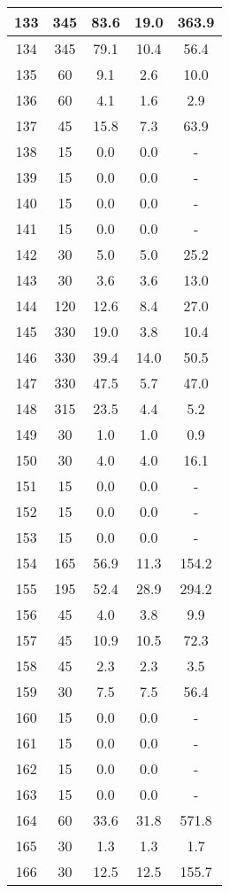 \documentclass[a4paper,10pt]{article}
\begin{document}
\begin{table}
\begin{tabular}{|c|c|c|c|c|}
\hline
133 & 345 & 83.6 & 19.0 & 363.9 \\
\hline
134 & 345 & 79.1 & 10.4 & 56.4 \\
\hline
135 & 60 & 9.1 & 2.6 & 10.0 \\
\hline
136 & 60 & 4.1 & 1.6 & 2.9 \\
\hline
137 & 45 & 15.8 & 7.3 & 63.9 \\
\hline
138 & 15 & 0.0 & 0.0 & - \\
\hline
139 & 15 & 0.0 & 0.0 & - \\
\hline
140 & 15 & 0.0 & 0.0 & - \\
\hline
141 & 15 & 0.0 & 0.0 & - \\
\hline
142 & 30 & 5.0 & 5.0 & 25.2 \\
\hline
143 & 30 & 3.6 & 3.6 & 13.0 \\
\hline
144 & 120 & 12.6 & 8.4 & 27.0 \\
\hline
145 & 330 & 19.0 & 3.8 & 10.4 \\
\hline
146 & 330 & 39.4 & 14.0 & 50.5 \\
\hline
147 & 330 & 47.5 & 5.7 & 47.0 \\
\hline
148 & 315 & 23.5 & 4.4 & 5.2 \\
\hline
149 & 30 & 1.0 & 1.0 & 0.9 \\
\hline
150 & 30 & 4.0 & 4.0 & 16.1 \\
\hline
151 & 15 & 0.0 & 0.0 & - \\
\hline
152 & 15 & 0.0 & 0.0 & - \\
\hline
153 & 15 & 0.0 & 0.0 & - \\
\hline
154 & 165 & 56.9 & 11.3 & 154.2 \\
\hline
155 & 195 & 52.4 & 28.9 & 294.2 \\
\hline
156 & 45 & 4.0 & 3.8 & 9.9 \\
\hline
157 & 45 & 10.9 & 10.5 & 72.3 \\
\hline
158 & 45 & 2.3 & 2.3 & 3.5 \\
\hline
159 & 30 & 7.5 & 7.5 & 56.4 \\
\hline
160 & 15 & 0.0 & 0.0 & - \\
\hline
161 & 15 & 0.0 & 0.0 & - \\
\hline
162 & 15 & 0.0 & 0.0 & - \\
\hline
163 & 15 & 0.0 & 0.0 & - \\
\hline
164 & 60 & 33.6 & 31.8 & 571.8 \\
\hline
165 & 30 & 1.3 & 1.3 & 1.7 \\
\hline
166 & 30 & 12.5 & 12.5 & 155.7 \\

\end{tabular}
\end{table}
\end{document}
